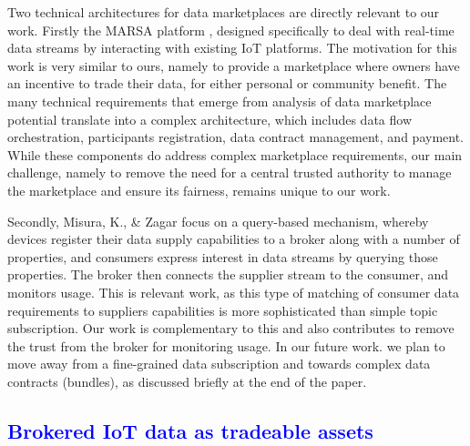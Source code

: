 \documentclass[chi_draft]{sigchi}
\begin{document}
Two technical architectures for data marketplaces are directly relevant to our work.
Firstly the MARSA platform \cite{Cao:2016:MMR:2926746.2883611}, designed specifically to deal with real-time data streams by interacting with existing IoT platforms.
The motivation for this work is very similar to ours, namely to provide a marketplace where owners have an incentive to trade their data, for either personal or community benefit.
The many technical requirements that emerge from analysis of data marketplace potential translate into a complex architecture, which includes data flow orchestration, participants registration, data contract management, and payment.  
While these components do address complex marketplace requirements, our main challenge, namely to remove the need for a central trusted authority to manage the marketplace and ensure its fairness, remains unique to our work.

Secondly, Misura, K., \& Zagar \cite{7765669} focus on a query-based mechanism, whereby devices register their data supply capabilities to a broker along with a number of properties, and consumers express interest in data streams by querying those properties. The broker then connects the supplier stream to the consumer, and monitors usage. 
This is relevant work, as this type of matching of consumer data requirements to suppliers capabilities is more sophisticated than simple topic subscription. Our work is complementary to this  and also contributes to remove the trust from the broker for monitoring usage.
In our future work. we plan to move away from a fine-grained data subscription and towards complex data contracts (bundles), as discussed briefly at the end of the paper.
\textcolor{blue}{\section{Brokered IoT data as tradeable assets}}
\end{document}
